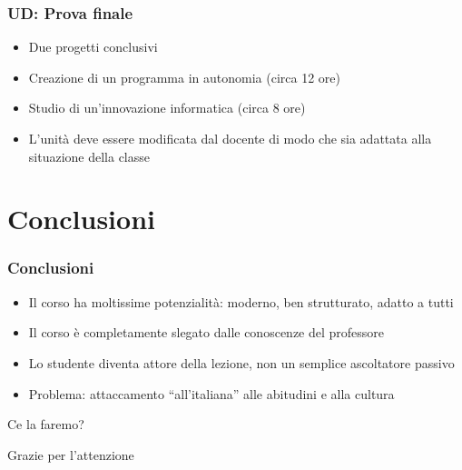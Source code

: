 \documentclass[
    hyperref={colorlinks,citecolor=black,linkcolor=black,urlcolor=blue}
]{beamer}
\begin{document}
\begin{frame}
  \frametitle{UD: Prova finale}

  \begin{itemize}
    \item Due progetti conclusivi
    \item Creazione di un programma in autonomia (circa 12 ore)
    \item Studio di un'innovazione informatica (circa 8 ore)
  \end{itemize}

  \begin{itemize}
    \item L'unità deve essere modificata dal docente di modo che sia adattata alla situazione della classe
  \end{itemize}
\end{frame}

\section{Conclusioni}

\begin{frame}
  \frametitle{Conclusioni}

  \begin{itemize}
    \item Il corso ha moltissime potenzialità: moderno, ben strutturato, adatto a tutti
    \item Il corso è completamente slegato dalle conoscenze del professore
    \item Lo studente diventa attore della lezione, non un semplice ascoltatore passivo
  \end{itemize}
  \begin{itemize}
    \item Problema: attaccamento ``all'italiana'' alle abitudini e alla cultura
  \end{itemize}

  \vspace{1em}

  \centerline{Ce la faremo?}
\end{frame}

\begin{frame}
  \Huge{\centerline{Grazie per l'attenzione}}
\end{frame}

\end{document}
